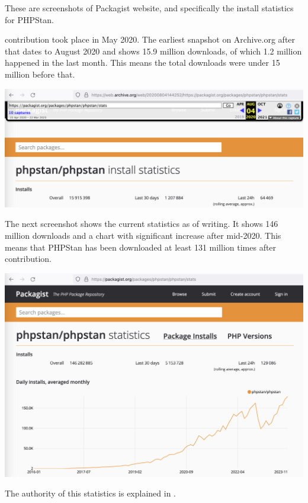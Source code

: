 
These are screenshots of Packagist website, and specifically the install statistics for PHPStan.

\mrls contribution took place in May 2020.
The earliest snapshot on Archive.org after that dates to August 2020 and shows 15.9 million downloads,
of which 1.2 million happened in the last month.
This means the total downloads were under 15 million before that.

\includegraphics[width=\textwidth]{packagist-stat-2020}

The next screenshot shows the current statistics as of writing.
It shows 146 million downloads and a chart with significant increase after mid-2020.
This means that PHPStan has been downloaded at least 131 million times after \mrls contribution.

\includegraphics[width=\textwidth]{packagist-stat}

The authority of this statistics is explained in .

\pagebreak
